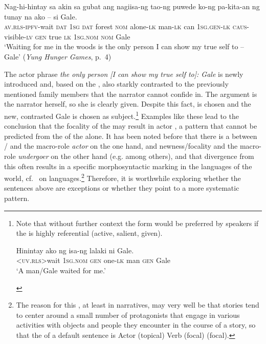 \documentclass[output=paper,
,modfonts
,nonflat]{langsci/langscibook}
\begin{document}
\begin{exe}
\ex\label{hunger_games1}
\gll Nag-hi-hintay {{\ob}sa} {akin{\cb}\ug} sa gubat {{\ob}ang} nagiisa-ng tao-ng puwede ko-ng pa-kita-an ng tunay na ako -- si {Gale{\cb}\act}.\\
\textsc{av.rls-ipfv}-wait \textsc{\void{[}dat} \textsc{1sg} \textsc{dat} forest \textsc{\void{[}nom} alone-\textsc{lk} man-\textsc{lk} can   \textsc{1sg.gen-lk}    \textsc{caus}-visible-\textsc{lv}    \textsc{gen} true \textsc{lk} \textsc{1sg.nom} {}    \textsc{nom} Gale\\
\glt `Waiting for me in the woods is the only person I can show
my true self to -- Gale'  (\textit{Yung Hunger Games}, p.\ 4)
\end{exe}

\noindent The actor phrase \textit{the only person [I can show my true self to]: Gale} is newly introduced and, based on the , also starkly contrasted to the previously mentioned family members that the narrator cannot confide in. The  argument is the narrator herself, so she is clearly given. Despite this fact,  is chosen and the new, contrasted  Gale is chosen as subject.\footnote{Note that without further context the  form would be preferred by speakers if the  is highly referential (active, salient, given).
\begin{exe}
\ex
\gll H{\USSmaller}in{\USGreater}intay ako ng  isa-ng lalaki {\USSlash} ni Gale. \\
     \textsc{<uv.rls>}wait \textsc{1sg.nom}  \textsc{gen} one-\textsc{lk} man {} \textsc{gen} Gale\\
\glt `A man/Gale waited for me.'
\end{exe}} Examples like these lead \cite{latan11} to the conclusion that the focality of the  may result in actor , a pattern that cannot be predicted from the  of the  alone. It has been noted before that there is a  between / and the macro-role \textit{actor} on the one hand, and newness/focality and the macro-role \textit{undergoer} on the other hand (e.g. \citealt{Lambrecht1994} among others), and that divergence from this  often results in a specific morphosyntactic marking in the languages of the world, cf.\ \cite{gueto15} on  languages.\footnote{The reason for this , at least in narratives, may very well be that stories tend to center around a small number of protagonists that engage in various activities with objects and people they encounter in the course of a story, so that the  of a default sentence is Actor (topical) Verb (focal)  (focal).} Therefore, it is worthwhile exploring whether the sentences above are exceptions or whether they point to a more systematic pattern.
\end{document}
